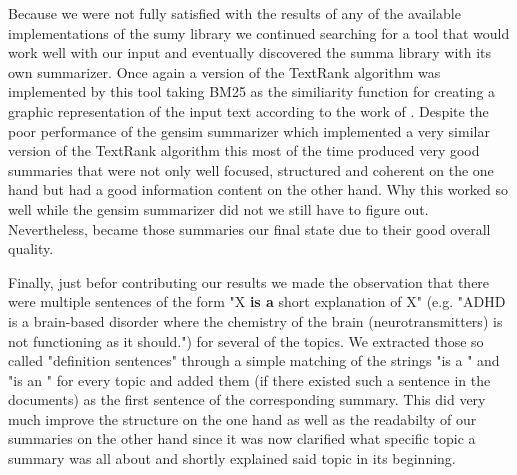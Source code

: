 Because we were not fully satisfied with the results of any of the available implementations of the sumy library we continued searching for a tool that would work well with our input and eventually discovered the summa library with its own summarizer. Once again a version of the TextRank algorithm was implemented by this tool taking BM25 as the similiarity function for creating a graphic representation of the input text according to the work of \citet{DBLP:journals/corr/BarriosLAW16}. Despite the poor performance of the gensim summarizer which implemented a very similar version of the TextRank algorithm this most of the time produced very good summaries that were not only well focused, structured and coherent on the one hand but had a good information content on the other hand. Why this worked so well while the gensim summarizer did not we still have to figure out. Nevertheless, became those summaries our final state due to their good overall quality.  
 
Finally, just befor contributing our results we made the observation that there were multiple sentences of the form "X \textbf{is a} short explanation of X" (e.g. "ADHD is a brain-based disorder where the chemistry of the brain (neurotransmitters) is not functioning as it should.") for several of the topics. We extracted those so called "definition sentences" through a simple matching of the strings "is a " and "is an " for every topic and added them (if there existed such a sentence in the documents) as the first sentence of the corresponding summary. This did very much improve the structure on the one hand as well as the readabilty of our summaries on the other hand since it was now clarified what specific topic a summary was all about and shortly explained said topic in its beginning.
